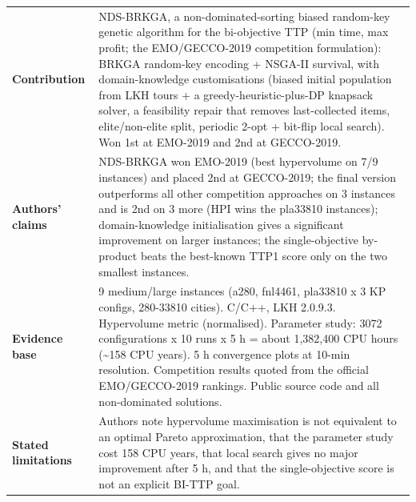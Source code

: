 \documentclass[
  a4paper,
  11pt,
  headings=small,
  numbers=noenddot,
  abstract=on,
  parskip=half,
]{scrartcl}
\begin{document}
\begin{landscape}
\begin{longtable}{@{}p{2.6cm}p{8.7cm}p{2.6cm}p{8.7cm}@{}}
\textbf{Contribution} & \multicolumn{3}{p{20.0cm}}{NDS-BRKGA, a non-dominated-sorting biased random-key genetic algorithm for the bi-objective TTP (min time, max profit; the EMO/GECCO-2019 competition formulation): BRKGA random-key encoding + NSGA-II survival, with domain-knowledge customisations (biased initial population from LKH tours + a greedy-heuristic-plus-DP knapsack solver, a feasibility repair that removes last-collected items, elite/non-elite split, periodic 2-opt + bit-flip local search). Won 1st at EMO-2019 and 2nd at GECCO-2019.} \\
\textbf{Authors' claims} & \multicolumn{3}{p{20.0cm}}{NDS-BRKGA won EMO-2019 (best hypervolume on 7/9 instances) and placed 2nd at GECCO-2019; the final version outperforms all other competition approaches on 3 instances and is 2nd on 3 more (HPI wins the pla33810 instances); domain-knowledge initialisation gives a significant improvement on larger instances; the single-objective by-product beats the best-known TTP1 score only on the two smallest instances.} \\
\textbf{Evidence base} & \multicolumn{3}{p{20.0cm}}{9 medium/large instances (a280, fnl4461, pla33810 x 3 KP configs, 280-33810 cities). C/C++, LKH 2.0.9.3. Hypervolume metric (normalised). Parameter study: 3072 configurations x 10 runs x 5 h = about 1,382,400 CPU hours (\textasciitilde{}158 CPU years). 5 h convergence plots at 10-min resolution. Competition results quoted from the official EMO/GECCO-2019 rankings. Public source code and all non-dominated solutions.} \\
\textbf{Stated limitations} & \multicolumn{3}{p{20.0cm}}{Authors note hypervolume maximisation is not equivalent to an optimal Pareto approximation, that the parameter study cost 158 CPU years, that local search gives no major improvement after 5 h, and that the single-objective score is not an explicit BI-TTP goal.} \\

\end{longtable}
\end{landscape}
\end{document}
